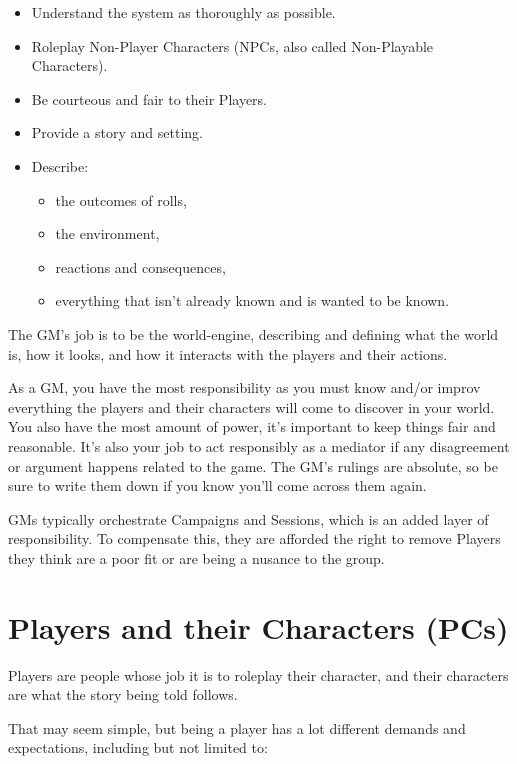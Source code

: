 \documentclass[../main.tex]{subfiles}
\begin{document}
    \begin{itemize}
        \item Understand the system as thoroughly as possible.
        \item Roleplay Non-Player Characters (NPCs, also called Non-Playable Characters).
        \item Be courteous and fair to their Players.
        \item Provide a story and setting.
        \item Describe:
        \begin{itemize}
            \item the outcomes of rolls,
            \item the environment,
            \item reactions and consequences,
            \item everything that isn't already known and is wanted to be known.
        \end{itemize}
    \end{itemize}
    
    The GM's job is to be the world-engine, describing and defining what the world is, how it looks, and how it interacts with the players and their actions.
    
    As a GM, you have the most responsibility as you must know and/or improv everything the players and their characters will come to discover in your world. You also have the most amount of power, it's important to keep things fair and reasonable. It's also your job to act responsibly as a mediator if any disagreement or argument happens related to the game. The GM's rulings are absolute, so be sure to write them down if you know you'll come across them again.
    
    GMs typically orchestrate Campaigns and Sessions, which is an added layer of responsibility. To compensate this, they are afforded the right to remove Players they think are a poor fit or are being a nusance to the group.

    \section{Players and their Characters (PCs)}

    Players are people whose job it is to roleplay their character, and their characters are what the story being told follows.

    That may seem simple, but being a player has a lot different demands and expectations, including but not limited to:
\end{document}
